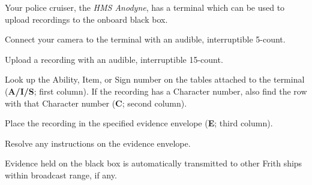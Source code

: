 \documentclass[green]{guildcamp4}
\begin{document}
Your police cruiser, the \emph{HMS Anodyne}, has a terminal which can be used to upload recordings to the onboard black box.

\begin{enum}
	\item Connect your camera to the terminal with an audible, interruptible 5-count.
    \item Upload a recording with an audible, interruptible 15-count.
    \item Look up the Ability, Item, or Sign number on the tables attached to the terminal ({\bf A/I/S}; first column). If the recording has a Character number, also find the row with that Character number ({\bf C}; second column).
    \item Place the recording in the specified evidence envelope ({\bf E}; third column).
    \item Resolve any instructions on the evidence envelope.
\end{enum}

\begin{itemz}[Notes]
	\item Evidence held on the black box is automatically transmitted to other Frith ships within broadcast range, if any.
\end{itemz}
\end{document}
